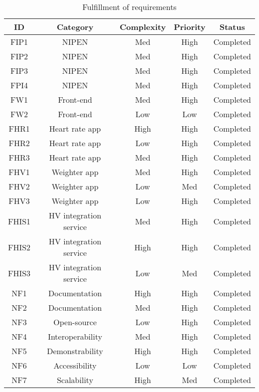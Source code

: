 \begin{table}[h]
\begin{center}
\begin{tabular}{ | c | c | c | c | c | }
  \hline
  \textbf{ID} & \textbf{Category} &\textbf{Complexity} & \textbf{Priority} & \textbf{Status}\\
  \hline\noalign{\smallskip}\hline
  FIP1	& NIPEN				& Med	& High & Completed \\
  FIP2	& NIPEN				& Med	& High & Completed \\
  FIP3	& NIPEN				& Med	& High & Completed \\
  FPI4	& NIPEN				& Med	& High & Completed \\
  FW1   & Front-end			& Med	& High & Completed \\
  FW2   & Front-end			& Low	& Low  & Completed \\
  FHR1	& Heart rate app	& High	& High & Completed \\
  FHR2	& Heart rate app	& Low	& High & Completed \\
  FHR3	& Heart rate app	& Med	& High & Completed \\
  FHV1	& Weighter app		& Med	& High & Completed \\
  FHV2	& Weighter app		& Low	& Med  & Completed \\
  FHV3	& Weighter app		& Low	& High & Completed \\

  FHIS1	& HV integration service	& Med   & High & Completed \\
  FHIS2	& HV integration service	& High  & High & Completed \\
  FHIS3	& HV integration service	& Low	& Med  & Completed \\

  NF1 & Documentation		& High 	& High	& Completed \\
  NF2 & Documentation		& Med 	& High	& Completed \\
  NF3 & Open-source			& Low 	& High	& Completed \\
  NF4 & Interoperability	& Med	& High	& Completed \\
  NF5 & Demonstrability	& High	& High	& Completed \\
  NF6 & Accessibility		& Low	& Low	& Completed \\
  NF7 & Scalability     & High & Med & Completed \\

  \hline
\end{tabular}
\end{center}
\caption{Fulfillment of requirements}
\label{table:fulfill-req}
\end{table}


